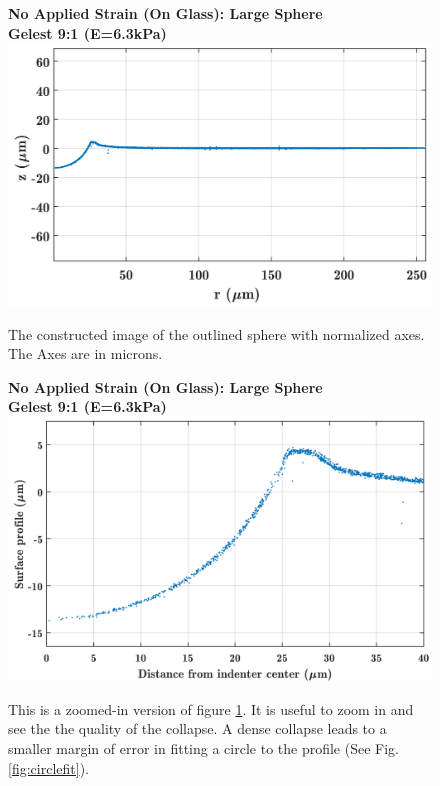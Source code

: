 \begin{figure}[h!]
	\centering
	\large \textbf{No Applied Strain (On Glass): Large Sphere}\\
	\large \textbf{Gelest 9:1 (E=6.3kPa)}
	\includegraphics[width=\linewidth]{Chapters/Figures/sphere011_ia/side_collapsed}
	\caption[Collapsed Side Profile]{The constructed image of the outlined sphere with normalized axes. The Axes are in microns.}
	\label{fig:sidecollapsed}
\end{figure}
\begin{figure}[h!]
	\centering
	\large \textbf{No Applied Strain (On Glass): Large Sphere}\\
	\large \textbf{Gelest 9:1 (E=6.3kPa)}
	\includegraphics[width=\linewidth]{Chapters/Figures/sphere011_ia/side_collapsed_zoomed}
	\caption[Collapsed Side Profile: Zoomed]{This is a zoomed-in version of figure \ref{fig:sidecollapsed}. It is useful to zoom in and see the the quality of the collapse. A dense collapse leads to a smaller margin of error in fitting a circle to the profile (See Fig. \ref{fig:circlefit}).}
	\label{fig:sidecollapsedzoomed}
\end{figure}

